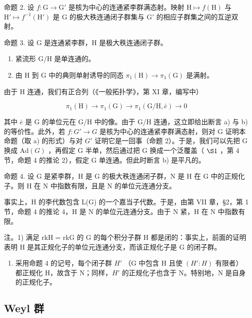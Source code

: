 命题 2. 设 \(f: \mathrm{G} \to \mathrm{G}'\) 是核为中心的连通紧李群满态射。映射 \(\mathrm{H} \mapsto f(\mathrm{H})\) 与 \(\mathrm{H}' \mapsto f^{-1}(\mathrm{H}')\) 是 \(\mathrm{G}\) 的极大秩连通闭子群集与 \(\mathrm{G}'\) 的相应子群集之间的互逆双射。

命题 3. 设 G 是连通紧李群，H 是极大秩连通闭子群。

\begin{enumerate}
\def\labelenumi{\alph{enumi})}
\item
  紧流形 G/H 是单连通的。
\item
  由 H 到 G 中的典则单射诱导的同态 \(\pi_1(\mathrm{H})\to \pi_1(\mathrm{G})\) 是满射。
\end{enumerate}

由于 H 连通，我们有正合列（《一般拓扑学》，第 XI 章，编写中）

\[
\pi_ {1} (\mathrm{H}) \rightarrow \pi_ {1} (\mathrm{G}) \rightarrow \pi_ {1} (\mathrm{G/H}, \bar {e}) \rightarrow 0
\]

其中 \(\bar{e}\) 是 G 的单位元在 G/H 中的像。由于 G/H 连通，这立即给出断言 a) 与 b) 的等价性。此外，若 \(f : G' \to G\) 是核为中心的连通紧李群满态射，则对 G 证明本命题（取 a) 的形式）与对 \(G'\) 证明它是一回事（命题 2）。于是，我们可以先把 G 换成 \(\text{Ad}(G)\) ，再假定 G 半单，然后通过把 G 换成一个泛覆盖（ \(\S1\) ，第 4 节，命题 4 的推论 2），假定 G 单连通。但此时断言 b) 是平凡的。

命题 4. 设 G 是紧李群，H 是 G 的极大秩连通闭子群，N 是 H 在 G 中的正规化子。则 H 在 N 中指数有限，且是 N 的单位元连通分支。

事实上，H 的李代数包含 L(G) 的一个嘉当子代数。于是，由第 VII 章，§2，第 1 节，命题 4 的推论 4，H 是 N 的单位元连通分支。由于 N 紧，H 在 N 中指数有限。

注。1) 满足 rkH = rkG 的 G 的每个积分子群 H 都是闭的：事实上，前面的证明表明 H 是其正规化子的单位元连通分支，而该正规化子是 G 的闭子群。

\begin{enumerate}
\def\labelenumi{\arabic{enumi})}
\setcounter{enumi}{1}
\tightlist
\item
  采用命题 4 的记号，每个闭子群 \(H'\) （G 中包含 H 且使 \((H':H)\) 有限者）都正规化 H，故含于 N；同样，\(H'\) 的正规化子也含于 N。特别地，N 是自身的正规化子。
\end{enumerate}

\subsection{Weyl 群}

